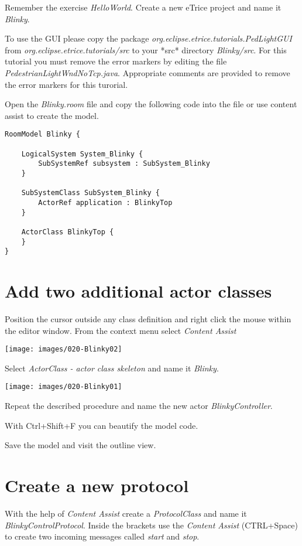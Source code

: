 Remember the exercise \textit{HelloWorld}.
Create a new eTrice project and name it \textit{Blinky}.

To use the GUI please copy the package \textit{org.eclipse.etrice.tutorials.PedLightGUI} from \textit{org.eclipse.etrice.tutorials/src} to your *src* directory \textit{Blinky/src}. For this tutorial you must remove the error markers by editing the file \textit{PedestrianLightWndNoTcp.java}. Appropriate comments are provided to remove the error markers for this turorial.

Open the \textit{Blinky.room} file and copy the following code into the file or use content assist to create the model.

\begin{verbatim} 
RoomModel Blinky {

    LogicalSystem System_Blinky {
        SubSystemRef subsystem : SubSystem_Blinky
    }

    SubSystemClass SubSystem_Blinky {
        ActorRef application : BlinkyTop
    }

    ActorClass BlinkyTop {
    }
}
\end{verbatim}

\section{Add two additional actor classes}

Position the cursor outside any class definition and right click the mouse within the editor window. From the context menu select \textit{Content Assist}  

\texttt{[image: images/020-Blinky02]}

Select \textit{ActorClass - actor class skeleton} and name it \textit{Blinky}.

\texttt{[image: images/020-Blinky01]}

Repeat the described procedure and name the new actor \textit{BlinkyController}.

With Ctrl+Shift+F you can beautify the model code. 

Save the model and visit the outline view.

\section{Create a new protocol}

With the help of \textit{Content Assist} create a \textit{ProtocolClass} and name it \textit{BlinkyControlProtocol}.
Inside the brackets use the \textit{Content Assist} (CTRL+Space) to create two incoming messages called \textit{start} and \textit{stop}.

